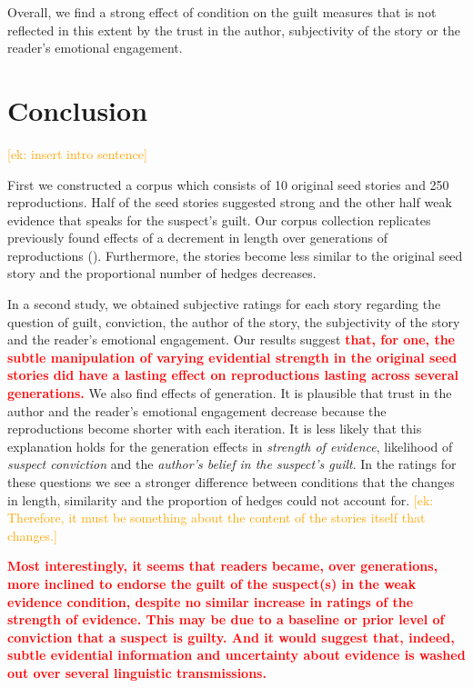 \documentclass[10pt,letterpaper]{article}
\newcommand{\ek}[1]{\textcolor{Orange}{[ek: #1]}}
\begin{document}
Overall, we find a strong effect of condition on the guilt measures that is not reflected in this extent by the trust in the author, subjectivity of the story or the reader's emotional engagement.

\section{Conclusion}

\ek{insert intro sentence}

First we constructed a corpus which consists of 10 original seed stories and 250 reproductions. Half of the seed stories suggested strong and the other half weak evidence that speaks for the suspect's guilt. Our corpus collection replicates previously found effects of a decrement in length over generations of reproductions (\cite{Bartlett:1932}). Furthermore, the stories become less similar to the original seed story and the proportional number of hedges decreases.

In a second study, we obtained subjective ratings for each story regarding the question of guilt, conviction, the author of the story, the subjectivity of the story and the reader's emotional engagement. Our results suggest \textbf{\textcolor{red}{that, for one, the subtle manipulation of varying evidential strength in the original seed stories did have a lasting effect on reproductions lasting across several generations.}} We also find effects of generation. It is plausible that trust in the author and the reader's emotional engagement decrease because the reproductions become shorter with each iteration. It is less likely that this explanation holds for the generation effects in \textit{strength of evidence}, likelihood of \textit{suspect conviction} and the \textit{author's belief in the suspect's guilt}. In the ratings for these questions we see a stronger difference between conditions that the changes in length, similarity and the proportion of hedges could not account for. \ek{Therefore, it must be something about the content of the stories itself that changes.}

\textbf{\textcolor{red}{ Most interestingly, it seems that readers became, over generations, more inclined to endorse the guilt of the suspect(s) in the weak evidence condition, despite no similar increase in ratings of the strength of evidence. This may be due to a baseline or prior level of conviction that a suspect is guilty. And it would suggest that, indeed, subtle evidential information and uncertainty about evidence is washed out over several linguistic transmissions.}}
\end{document}
